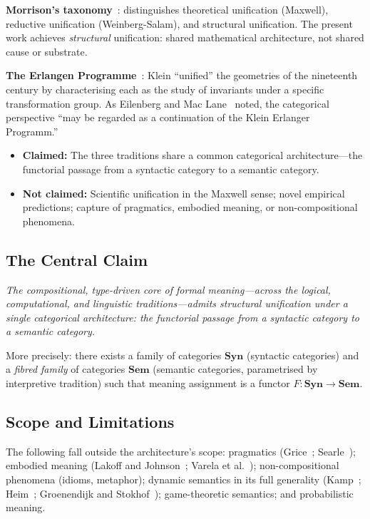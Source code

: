 \documentclass[12pt,a4paper]{article}
\begin{document}
\textbf{Morrison's taxonomy}~\cite{Morrison2000}: distinguishes theoretical
unification (Maxwell), reductive unification (Weinberg-Salam), and structural
unification. The present work achieves \emph{structural} unification: shared
mathematical architecture, not shared cause or substrate.

\textbf{The Erlangen Programme}~\cite{Klein1872}: Klein ``unified'' the
geometries of the nineteenth century by characterising each as the study of
invariants under a specific transformation group. As
Eilenberg and Mac Lane~\cite{EilenbergMacLane1945} noted, the categorical
perspective ``may be regarded as a continuation of the Klein Erlanger
Programm.''

\begin{itemize}
  \item \textbf{Claimed:} The three traditions share a common categorical
    architecture---the functorial passage from a syntactic category to a
    semantic category.
  \item \textbf{Not claimed:} Scientific unification in the Maxwell sense;
    novel empirical predictions; capture of pragmatics, embodied meaning, or
    non-compositional phenomena.
\end{itemize}

\subsection{The Central Claim}

\emph{The compositional, type-driven core of formal meaning---across the
logical, computational, and linguistic traditions---admits structural
unification under a single categorical architecture: the functorial passage
from a syntactic category to a semantic category.}

More precisely: there exists a family of categories $\mathbf{Syn}$ (syntactic
categories) and a \emph{fibred family} of categories $\mathbf{Sem}$ (semantic
categories, parametrised by interpretive tradition) such that meaning
assignment is a functor $F \colon \mathbf{Syn} \to \mathbf{Sem}$.

\subsection{Scope and Limitations}

The following fall outside the architecture's scope: pragmatics
(Grice~\cite{Grice1975}; Searle~\cite{Searle1969}); embodied meaning
(Lakoff and Johnson~\cite{LakoffJohnson1980};
Varela et al.~\cite{VarelaThompsonRosch1991}); non-compositional phenomena
(idioms, metaphor); dynamic semantics in its full generality
(Kamp~\cite{Kamp1981}; Heim~\cite{Heim1982};
Groenendijk and Stokhof~\cite{GroenendijkStokhof1991});
game-theoretic semantics; and probabilistic meaning.
\end{document}
